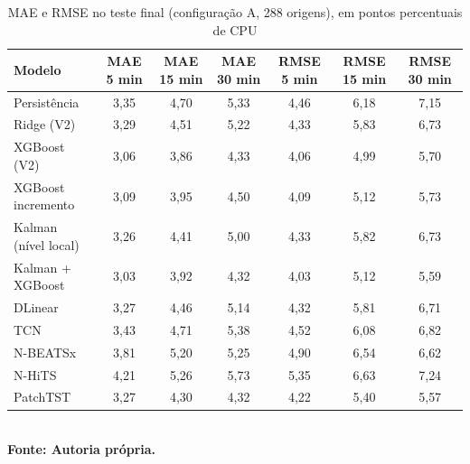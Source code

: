 \begin{table}[htb]
\caption{MAE e RMSE no teste final (configuração A, 288 origens), em pontos percentuais de CPU}
\label{tab:v3-metricas-teste}
\centering
\footnotesize
\setlength{\tabcolsep}{3pt}
\renewcommand{\arraystretch}{1.15}
\begin{tabular}{|l|c|c|c|c|c|c|}
\hline
\textbf{Modelo} & \textbf{MAE 5 min} & \textbf{MAE 15 min} & \textbf{MAE 30 min} & \textbf{RMSE 5 min} & \textbf{RMSE 15 min} & \textbf{RMSE 30 min} \\
\hline
Persistência & 3{,}35 & 4{,}70 & 5{,}33 & 4{,}46 & 6{,}18 & 7{,}15 \\
Ridge (V2) & 3{,}29 & 4{,}51 & 5{,}22 & 4{,}33 & 5{,}83 & 6{,}73 \\
XGBoost (V2) & 3{,}06 & 3{,}86 & 4{,}33 & 4{,}06 & 4{,}99 & 5{,}70 \\
XGBoost incremento & 3{,}09 & 3{,}95 & 4{,}50 & 4{,}09 & 5{,}12 & 5{,}73 \\
Kalman (nível local) & 3{,}26 & 4{,}41 & 5{,}00 & 4{,}33 & 5{,}82 & 6{,}73 \\
Kalman + XGBoost & 3{,}03 & 3{,}92 & 4{,}32 & 4{,}03 & 5{,}12 & 5{,}59 \\
DLinear & 3{,}27 & 4{,}46 & 5{,}14 & 4{,}32 & 5{,}81 & 6{,}71 \\
TCN & 3{,}43 & 4{,}71 & 5{,}38 & 4{,}52 & 6{,}08 & 6{,}82 \\
N-BEATSx & 3{,}81 & 5{,}20 & 5{,}25 & 4{,}90 & 6{,}54 & 6{,}62 \\
N-HiTS & 4{,}21 & 5{,}26 & 5{,}73 & 5{,}35 & 6{,}63 & 7{,}24 \\
PatchTST & 3{,}27 & 4{,}30 & 4{,}32 & 4{,}22 & 5{,}40 & 5{,}57 \\
\hline
\end{tabular}\\
\textbf{\footnotesize Fonte: Autoria própria.}
\end{table}
